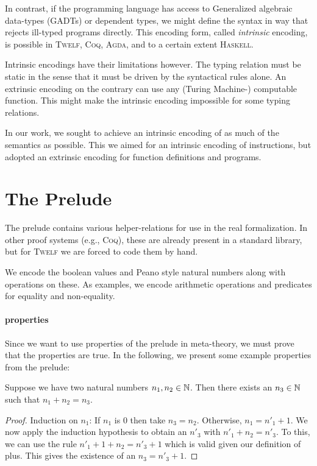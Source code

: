 \documentclass[a4paper, oneside, 10pt, draft]{memoir}
\newcommand{\twelf}{\textsc{Twelf}}
\newcommand{\coq}{\textsc{Coq}}
\newcommand{\agda}{\textsc{Agda}}
\newcommand{\haskell}{\textsc{Haskell}}
\begin{document}
In contrast, if the programming language has access to Generalized
algebraic data-types (GADTs) or dependent types, we might define the
syntax in way that rejects ill-typed programs directly. This encoding
form, called \emph{intrinsic} encoding, is possible in \twelf{},
\coq{}, \agda{}, and to a certain extent \haskell{}.

Intrinsic encodings have their limitations however. The typing
relation must be static in the sense that it must be driven by the
syntactical rules alone. An extrinsic encoding on the contrary can use
any (Turing Machine-) computable function. This might make the
intrinsic encoding impossible for some typing relations.

In our work, we sought to achieve an intrinsic encoding of as much of
the semantics as possible. This we aimed for an intrinsic encoding of
instructions, but adopted an extrinsic encoding for function
definitions and programs.

\section{The Prelude}

The prelude contains various helper-relations for use in the real
formalization. In other proof systems (e.g., \coq{}\cite{team:coq*1}),
these are already present in a standard library, but for \twelf{} we
are forced to code them by hand.

We encode the boolean values and Peano style natural numbers along with
operations on these. As examples, we encode arithmetic operations and
predicates for equality and non-equality.

\paragraph{properties}

Since we want to use properties of the prelude in meta-theory, we must
prove that the properties are true. In the following, we present some
example properties from the prelude:
\begin{lem}
  Suppose we have two natural numbers $n_1, n_2 \in \mathbb{N}$. Then there
  exists an $n_3 \in \mathbb{N}$ such that $n_1 + n_2 = n_3$.
\end{lem}
\begin{proof}
  Induction on $n_1$: If $n_1$ is $0$ then take $n_3 =
  n_2$. Otherwise, $n_1 = n'_1 + 1$. We now apply the induction
  hypothesis to obtain an $n'_3$ with $n'_1 + n_2 = n'_3$. To this, we
  can use the rule $n'_1 + 1 + n_2 = n'_3 + 1$ which is valid given
  our definition of plus. This gives the existence of an $n_3 = n'_3 +
  1$.
\end{proof}
\end{document}
